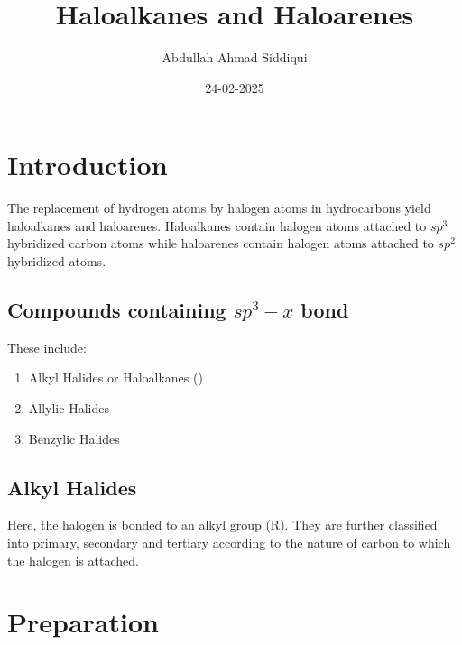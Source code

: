 \documentclass{article}
\title{Haloalkanes and Haloarenes}
\author{Abdullah Ahmad Siddiqui}
\date{24-02-2025}
\begin{document}
\maketitle
\tableofcontents 

\section{Introduction}
The replacement of hydrogen atoms by halogen atoms in hydrocarbons
yield haloalkanes and haloarenes.
Haloalkanes contain halogen atoms attached to $sp^3$
hybridized carbon atoms while haloarenes contain halogen
atoms attached to $sp^2$ hybridized atoms.
\subsection{Compounds containing $sp^3-x$ bond}
These include:
\begin{enumerate}
  \item Alkyl Halides or Haloalkanes ()
  \item{Allylic Halides}
  \item{Benzylic Halides}
\end{enumerate}
\subsection{Alkyl Halides}
Here, the halogen is bonded to an alkyl group (R). They are further 
classified into primary, secondary and tertiary according to the
nature of carbon to which the halogen is attached.

\newpage{}
\qquad
{} \qquad{}

\section{Preparation}
  
\end{document}
